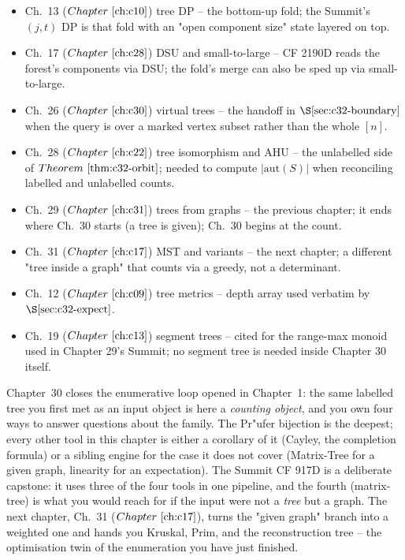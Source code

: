 \begin{itemize}[nosep]
  \item Ch.~13 (\(\chref{c10}\)) tree DP -- the bottom-up fold; the Summit's
        \((j,t)\) DP is that fold with an "open component size" state
        layered on top.
  \item Ch.~17 (\(\chref{c28}\)) DSU and small-to-large -- CF 2190D reads
        the forest's components via DSU; the fold's merge can also be
        sped up via small-to-large.
  \item Ch.~26 (\(\chref{c30}\)) virtual trees -- the handoff in
        \(\secref{c32-boundary}\) when the query is over a marked vertex
        subset rather than the whole \([n]\).
  \item Ch.~28 (\(\chref{c22}\)) tree isomorphism and AHU -- the unlabelled
        side of \(\thmref{c32-orbit}\); needed to compute \(|\mathrm{aut}(S)|\) when reconciling labelled and unlabelled counts.
  \item Ch.~29 (\(\chref{c31}\)) trees from graphs -- the previous chapter;
        it ends where Ch.~30 starts (a tree is given); Ch.~30 begins at
        the count.
  \item Ch.~31 (\(\chref{c17}\)) MST and variants -- the next chapter;
        a different "tree inside a graph" that counts via a greedy, not
        a determinant.
  \item Ch.~12 (\(\chref{c09}\)) tree metrics -- depth array used verbatim
        by \(\secref{c32-expect}\).
  \item Ch.~19 (\(\chref{c13}\)) segment trees -- cited for the range-max
        monoid used in Chapter 29's Summit; no segment tree is needed
        inside Chapter 30 itself.
\end{itemize}

\begin{lastword}
Chapter~30 closes the enumerative loop opened in Chapter~1: the same
labelled tree you first met as an input object is here a \emph{counting
object}, and you own four ways to answer questions about the family.  The
Pr"ufer bijection is the deepest; every other tool in this chapter is
either a corollary of it (Cayley, the completion formula) or a sibling
engine for the case it does not cover (Matrix-Tree for a given graph,
linearity for an expectation).  The Summit CF 917D is a deliberate
capstone: it uses three of the four tools in one pipeline, and the fourth
(matrix-tree) is what you would reach for if the input were not a \emph{
tree} but a graph.  The next chapter, Ch.~31 (\(\chref{c17}\)), turns the
"given graph" branch into a weighted one and hands you Kruskal, Prim, and
the reconstruction tree -- the optimisation twin of the enumeration you
have just finished.
\end{lastword}

